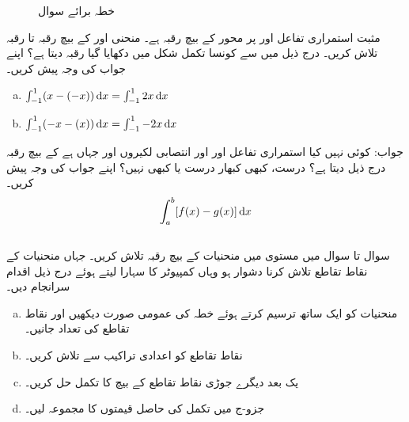 \begin{figure}
\begin{minipage}{0.3\textwidth}
\caption{خطہ برائے سوال }
\label{شکل_سوال_تکمل_استعمال_رقبہ_محیط_خاکہ_پ}
\end{minipage}
\end{figure}
%
مثبت استمراری تفاعل  اور  پر  محور کے بیچ رقبہ  ہے۔ منحنی  اور  کے بیچ رقبہ   تا  رقبہ تلاش کریں۔
درج ذیل میں سے کونسا تکمل شکل  میں دکھایا گیا رقبہ دیتا ہے؟ اپنے جواب کی وجہ پیش کریں۔
\begin{enumerate}[a.]
\item
$\int_{-1}^1(x-(-x))\dif x=\int_{-1}^12x\dif x$
\item
$\int_{-1}^1(-x-(x))\dif x=\int_{-1}^1-2x\dif x$
\end{enumerate}
جواب:\quad
کوئی نہیں
کیا استمراری تفاعل  اور  اور انتصابی لکیروں  اور  جہاں  ہے کے بیچ رقبہ درج ذیل دیتا ہے؟ درست، کبھی کبھار درست یا کبھی نہیں؟ اپنے جواب کی وجہ پیش کریں۔
\begin{align*}
\int_a^b[f(x)-g(x)]\dif x
\end{align*}
\\
سوال  تا سوال  میں مستوی میں منحنیات کے بیچ رقبہ تلاش کریں۔ جہاں منحنیات کے نقاط تقاطع تلاش کرنا دشوار ہو وہاں کمپیوٹر کا سہارا لیتے ہوئے درج ذیل اقدام سرانجام دیں۔
\begin{enumerate}[a.]
\item
منحنیات کو ایک ساتھ ترسیم کرتے ہوئے خطہ کی عمومی صورت دیکھیں اور نقاط تقاطع کی تعداد جانیں۔
\item
نقاط تقاطع کو اعدادی تراکیب سے تلاش کریں۔
\item
یک بعد دیگرے جوڑی نقاط تقاطع کے بیچ  کا تکمل حل کریں۔
\item
جزو-ج میں تکمل کی حاصل قیمتوں کا مجموعہ لیں۔
\end{enumerate}

